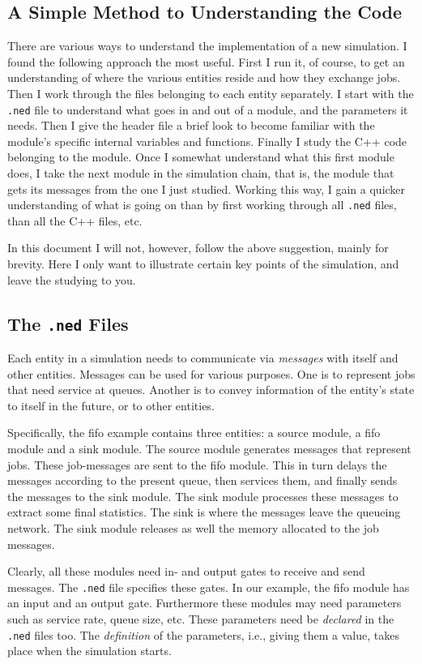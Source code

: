 \documentclass[a4paper]{article}
\begin{document}
\subsection{A Simple Method to Understanding the Code}
There are various ways to  understand the implementation of a
new simulation. I found the following approach the most useful. First I
run it, of course, to get an understanding of where the various
entities reside and how they exchange jobs. Then I work through the
files belonging to each entity separately. I start with the
\texttt{.ned} file to understand what goes in and out of a module, and
the parameters it needs.  Then I give the header file a brief look to
become familiar with the module's specific internal variables and
functions.  Finally I study the C++ code belonging to the module.
Once I somewhat understand what this first module does, I take the
next module in the simulation chain, that is, the module that gets its
messages from the one I just studied. Working this way, I gain a
quicker understanding of what is going on than by first working
through all \texttt{.ned} files, than all the C++ files, etc.

In this document I will not, however, follow the above suggestion,
mainly for brevity. Here I only want to illustrate certain key points
of the simulation, and leave the studying to you.

\subsection{The \texttt{.ned} Files}
\label{sec:texttt.ned-files}
Each entity in a simulation needs to communicate via \emph{messages}
with itself and other entities. Messages can be used for various
purposes. One is to represent jobs that need service at queues.
Another is to convey information of the entity's state to itself in
the future, or to other entities.

Specifically, the fifo example contains three entities: a source module,
a fifo module and a sink module. The source module generates messages
that represent jobs.  These job-messages are sent to the fifo module.
This in turn delays the messages according to the present queue, then
services them, and finally sends the messages to the sink module. The
sink module processes these messages to extract some final statistics.
The sink is where the messages leave the queueing network.  The sink
module releases as well the memory allocated to the job messages.

Clearly, all these modules need in- and output gates to receive and
send messages. The \texttt{.ned} file specifies these gates. In our
example, the fifo module has an input and an output gate. Furthermore
these modules may need parameters such as service rate, queue size,
etc. These parameters need be \emph{declared}  in the \texttt{.ned} files
too. The \emph{definition} of the parameters, i.e., giving them a
value, takes place when the simulation starts.
\end{document}
